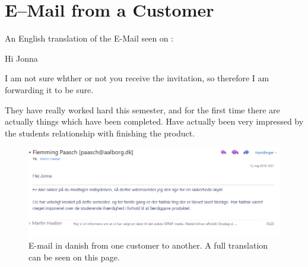 \chapter{E--Mail from a Customer}\label{app:mail}

An English translation of the E-Mail seen on :

Hi Jonna

I am not sure whther or not you receive the invitation, so therefore I am forwarding it to be sure.

They have really worked hard this semester, and for the first time there are actually things which have been completed. Have actually been very impressed by the students relationship with finishing the product.


\begin{figure}[h!]
    \includegraphics[width=\textwidth]{figures/img/email.png}
    \caption{E-mail in danish from one customer to another. A full translation can be seen on this page.}\label{fig:email}
\end{figure}

